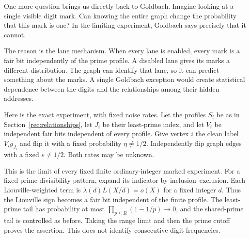 One more question brings us directly back to Goldbach. Imagine looking
at a single visible digit mark. Can knowing the entire graph change
the probability that this mark is one? In the limiting experiment,
Goldbach says precisely that it cannot.

The reason is the lane mechanism. When every lane is enabled, every
mark is a fair bit independently of the prime profile. A disabled
lane gives its marks a different distribution. The graph can identify
that lane, so it can predict something about the marks. A single
Goldbach exception would create statistical dependence between the
digits and the relationships among their hidden addresses.

Here is the exact experiment, with fixed noise rates.
Let the profiles $S_i$ be as in Section~\ref{rec:relationships}, let
$J_i$ be their least-prime index, and let $V_i$ be independent fair
bits independent of every profile. Give vertex $i$ the clean label
$V_i g_{J_i}$ and flip it with a fixed probability $\eta\ne1/2$.
Independently flip graph edges with a fixed $\varepsilon\ne1/2$.
Both rates may be unknown.

This is the limit of every fixed finite ordinary-integer marked
experiment. For a fixed prime-divisibility pattern, expand its indicator
by inclusion--exclusion. Each Liouville-weighted term is
$\lambda(d)L(X/d)=o(X)$ for a fixed integer $d$. Thus the Liouville
sign becomes a fair bit independent of the finite profile. The
least-prime tail has probability at most
$\prod_{p\le R}(1-1/p)\to0$, and the shared-prime tail is controlled
as before. Taking the range limit and then the prime cutoff proves
the assertion. This does not identify consecutive-digit frequencies.

